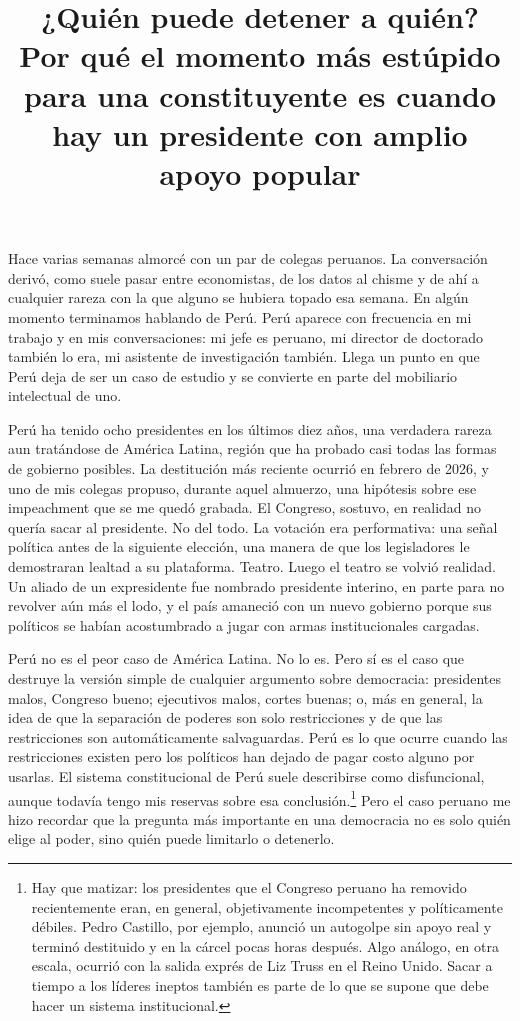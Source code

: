 \documentclass[11pt,letterpaper]{article}
\title{\textbf{¿Quién puede detener a quién?}\\[0.5em]
\large\normalfont Por qué el momento más estúpido para una constituyente es cuando hay un presidente con amplio apoyo popular}
\author{}
\date{}
\begin{document}
\maketitle

Hace varias semanas almorcé con un par de colegas peruanos. La conversación derivó, como suele pasar entre economistas, de los datos al chisme y de ahí a cualquier rareza con la que alguno se hubiera topado esa semana. En algún momento terminamos hablando de Perú. Perú aparece con frecuencia en mi trabajo y en mis conversaciones: mi jefe es peruano, mi director de doctorado también lo era, mi asistente de investigación también. Llega un punto en que Perú deja de ser un caso de estudio y se convierte en parte del mobiliario intelectual de uno.

Perú ha tenido ocho presidentes en los últimos diez años, una verdadera rareza aun tratándose de América Latina, región que ha probado casi todas las formas de gobierno posibles. La destitución más reciente ocurrió en febrero de 2026, y uno de mis colegas propuso, durante aquel almuerzo, una hipótesis sobre ese impeachment que se me quedó grabada. El Congreso, sostuvo, en realidad no quería sacar al presidente. No del todo. La votación era performativa: una señal política antes de la siguiente elección, una manera de que los legisladores le demostraran lealtad a su plataforma. Teatro. Luego el teatro se volvió realidad. Un aliado de un expresidente fue nombrado presidente interino, en parte para no revolver aún más el lodo, y el país amaneció con un nuevo gobierno porque sus políticos se habían acostumbrado a jugar con armas institucionales cargadas.

Perú no es el peor caso de América Latina. No lo es. Pero sí es el caso que destruye la versión simple de cualquier argumento sobre democracia: presidentes malos, Congreso bueno; ejecutivos malos, cortes buenas; o, más en general, la idea de que la separación de poderes son solo restricciones y de que las restricciones son automáticamente salvaguardas. Perú es lo que ocurre cuando las restricciones existen pero los políticos han dejado de pagar costo alguno por usarlas. El sistema constitucional de Perú suele describirse como disfuncional, aunque todavía tengo mis reservas sobre esa conclusión.\footnote{Hay que matizar: los presidentes que el Congreso peruano ha removido recientemente eran, en general, objetivamente incompetentes y políticamente débiles. Pedro Castillo, por ejemplo, anunció un autogolpe sin apoyo real y terminó destituido y en la cárcel pocas horas después. Algo análogo, en otra escala, ocurrió con la salida exprés de Liz Truss en el Reino Unido. Sacar a tiempo a los líderes ineptos también es parte de lo que se supone que debe hacer un sistema institucional.} Pero el caso peruano me hizo recordar que la pregunta más importante en una democracia no es solo quién elige al poder, sino quién puede limitarlo o detenerlo.
\end{document}
